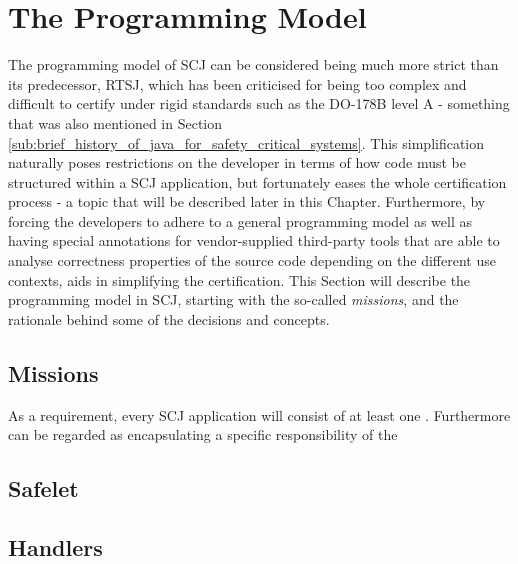 \section{The Programming Model}
\label{section:programmingmodel}
The programming model of SCJ can be considered being much more strict than its predecessor, RTSJ, which has been criticised for being too complex and difficult to certify under rigid standards such as the DO-178B level A - something that was also mentioned in Section \ref{sub:brief_history_of_java_for_safety_critical_systems}. This simplification naturally poses restrictions on the developer in terms of how code must be structured within a SCJ application, but fortunately eases the whole certification process - a topic that will be described later in this Chapter. Furthermore, by forcing the developers to adhere to a general programming model as well as having special annotations for vendor-supplied third-party tools that are able to analyse correctness properties of the source code depending on the different use contexts, aids in simplifying the certification. This Section will describe the programming model in SCJ, starting with the so-called \textit{missions}, and the rationale behind some of the decisions and concepts.


\subsection{Missions}
As a requirement, every SCJ application will consist of at least one . Furthermore  can be regarded as encapsulating a specific responsibility of the 

\subsection{Safelet}

\subsection{Handlers}